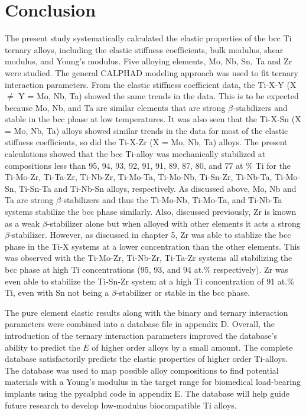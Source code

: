 \section{Conclusion}

The present study systematically calculated the elastic properties of the bcc Ti ternary alloys, including the elastic stiffness coefficients, bulk modulus, shear modulus, and Young's modulus. Five alloying elements, Mo, Nb, Sn, Ta and Zr were studied. The general CALPHAD modeling approach was used to fit ternary interaction parameters. From the elastic stiffness coefficient data, the Ti-X-Y (X $\neq$ Y = Mo, Nb, Ta) showed the same trends in the data. This is to be expected because Mo, Nb, and Ta are similar elements that are strong $\beta$-stabilizers and stable in the bcc phase at low temperatures. It was also seen that the Ti-X-Sn (X = Mo, Nb, Ta) alloys showed similar trends in the data for most of the elastic stiffness coefficients, so did the Ti-X-Zr (X = Mo, Nb, Ta) alloys. The present calculations showed that the bcc Ti-alloy was mechanically stabilized at compositions less than 95, 94, 93, 92, 91, 91, 89, 87, 80, and 77 at \% Ti for the Ti-Mo-Zr, Ti-Ta-Zr, Ti-Nb-Zr, Ti-Mo-Ta, Ti-Mo-Nb, Ti-Sn-Zr, Ti-Nb-Ta, Ti-Mo-Sn, Ti-Sn-Ta and Ti-Nb-Sn alloys, respectively. As discussed above, Mo, Nb and Ta are strong $\beta$-stabilizers and thus the Ti-Mo-Nb, Ti-Mo-Ta, and Ti-Nb-Ta systems stabilize the bcc phase similarly. Also, discussed previously, Zr is known as a weak $\beta$-stabilizer alone but when alloyed with other elements it acts a strong $\beta$-stabilizer. However, as discussed in chapter 5, Zr was able to stablize the bcc phase in the Ti-X systems at a lower concentration than the other elements. This was observed with the Ti-Mo-Zr, Ti-Nb-Zr, Ti-Ta-Zr systems all stabilizing the bcc phase at high Ti concentrations (95, 93, and 94 at.\% respectively). Zr was even able to stabilize the Ti-Sn-Zr system at a high Ti concentration of 91 at.\% Ti, even with Sn not being a $\beta$-stabilizer or stable in the bcc phase. 

The pure element elastic results along with the binary and ternary interaction parameters were combined into a database file in appendix D. Overall, the introduction of the ternary interaction parameters improved the database's ability to predict the $E$ of higher order alloys by a small amount. The complete database satisfactorily predicts the elastic properties of higher order Ti-alloys. The database was used to map possible alloy compositions to find potential materials with a Young's modulus in the target range for biomedical load-bearing implants using the pycalphd code in appendix E.  The database will help guide future research to develop low-modulus biocompatible Ti alloys.

